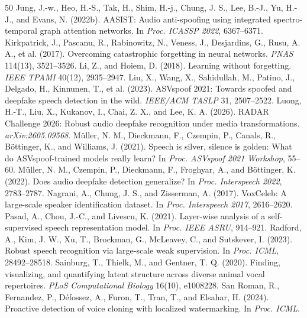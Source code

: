 \documentclass[10pt,a4paper,twocolumn]{article}
\begin{document}
{\begin{thebibliography}{50}
 Jung, J.-w., Heo, H.-S., Tak, H., Shim, H.-j., Chung, J. S., Lee, B.-J., Yu, H.-J., and Evans, N. (2022b). AASIST: Audio anti-spoofing using integrated spectro-temporal graph attention networks. In \emph{Proc. ICASSP 2022}, 6367--6371.
 Kirkpatrick, J., Pascanu, R., Rabinowitz, N., Veness, J., Desjardins, G., Rusu, A. A., et al. (2017). Overcoming catastrophic forgetting in neural networks. \emph{PNAS} 114(13), 3521--3526.
 Li, Z., and Hoiem, D. (2018). Learning without forgetting. \emph{IEEE TPAMI} 40(12), 2935--2947.
 Liu, X., Wang, X., Sahidullah, M., Patino, J., Delgado, H., Kinnunen, T., et al. (2023). ASVspoof 2021: Towards spoofed and deepfake speech detection in the wild. \emph{IEEE/ACM TASLP} 31, 2507--2522.
 Luong, H.-T., Liu, X., Kukanov, I., Chai, Z. X., and Lee, K. A. (2026). RADAR Challenge 2026: Robust audio deepfake recognition under media transformations. \emph{arXiv:2605.09568}.
 M\"uller, N. M., Dieckmann, F., Czempin, P., Canals, R., B\"ottinger, K., and Williams, J. (2021). Speech is silver, silence is golden: What do ASVspoof-trained models really learn? In \emph{Proc. ASVspoof 2021 Workshop}, 55--60.
 M\"uller, N. M., Czempin, P., Dieckmann, F., Froghyar, A., and B\"ottinger, K. (2022). Does audio deepfake detection generalize? In \emph{Proc. Interspeech 2022}, 2783--2787.
 Nagrani, A., Chung, J. S., and Zisserman, A. (2017). VoxCeleb: A large-scale speaker identification dataset. In \emph{Proc. Interspeech 2017}, 2616--2620.
 Pasad, A., Chou, J.-C., and Livescu, K. (2021). Layer-wise analysis of a self-supervised speech representation model. In \emph{Proc. IEEE ASRU}, 914--921.
 Radford, A., Kim, J. W., Xu, T., Brockman, G., McLeavey, C., and Sutskever, I. (2023). Robust speech recognition via large-scale weak supervision. In \emph{Proc. ICML}, 28492--28518.
 Sainburg, T., Thielk, M., and Gentner, T. Q. (2020). Finding, visualizing, and quantifying latent structure across diverse animal vocal repertoires. \emph{PLoS Computational Biology} 16(10), e1008228.
 San Roman, R., Fernandez, P., D\'efossez, A., Furon, T., Tran, T., and Elsahar, H. (2024). Proactive detection of voice cloning with localized watermarking. In \emph{Proc. ICML}.

\end{thebibliography}}
\end{document}
